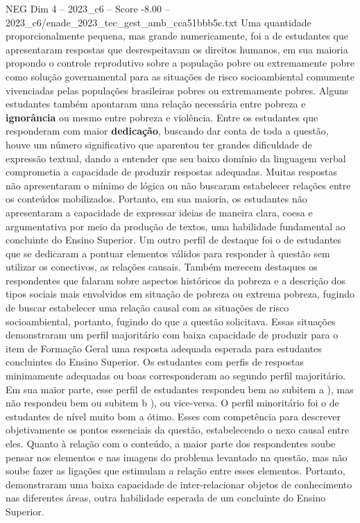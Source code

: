\begin{textsample}{NEG Dim 4 – 2023\_c6 – Score -8.00 – 2023\_c6/enade\_2023\_tec\_gest\_amb\_cca51bbb5c.txt}
Uma quantidade proporcionalmente pequena, mas grande numericamente, foi a de estudantes que apresentaram respostas que desrespeitavam os direitos humanos, em sua maioria propondo o controle reprodutivo sobre a população pobre ou extremamente pobre como solução governamental para as situações de risco socioambiental comumente vivenciadas pelas populações brasileiras pobres ou extremamente pobres.
Alguns estudantes também apontaram uma relação necessária entre pobreza e \textbf{ignorância} ou mesmo entre pobreza e violência.
Entre os estudantes que responderam com maior \textbf{dedicação}, buscando dar conta de toda a questão, houve um número significativo que aparentou ter grandes dificuldade de expressão textual, dando a entender que seu baixo domínio da linguagem verbal comprometia a capacidade de produzir respostas adequadas.
Muitas respostas não apresentaram o mínimo de lógica ou não buscaram estabelecer relações entre os conteúdos mobilizados.
Portanto, em sua maioria, os estudantes não apresentaram a capacidade de expressar ideias de maneira clara, coesa e argumentativa por meio da produção de textos, uma habilidade fundamental ao concluinte do Ensino Superior.
Um outro perfil de destaque foi o de estudantes que se dedicaram a pontuar elementos válidos para responder à questão sem utilizar os conectivos, as relações causais.
Também merecem destaques os respondentes que falaram sobre aspectos históricos da pobreza e a descrição dos tipos sociais mais envolvidos em situação de pobreza ou extrema pobreza, fugindo de buscar estabelecer uma relação causal com as situações de risco socioambiental, portanto, fugindo do que a questão solicitava.
Essas situações demonstraram um perfil majoritário com baixa capacidade de produzir para o item de Formação Geral uma resposta adequada esperada para estudantes concluintes do Ensino Superior.
Os estudantes com perfis de respostas minimamente adequadas ou boas corresponderam ao segundo perfil majoritário.
Em sua maior parte, esse perfil de estudantes respondeu bem ao subitem a ), mas não respondeu bem ou subitem b ), ou vice-versa.
O perfil minoritário foi o de estudantes de nível muito bom a ótimo.
Esses com competência para descrever objetivamente os pontos essenciais da questão, estabelecendo o nexo causal entre eles.
Quanto à relação com o conteúdo, a maior parte dos respondentes soube pensar nos elementos e nas imagens do problema levantado na questão, mas não soube fazer as ligações que estimulam a relação entre esses elementos.
Portanto, demonstraram uma baixa capacidade de inter-relacionar objetos de conhecimento nas diferentes áreas, outra habilidade esperada de um concluinte do Ensino Superior.

\end{textsample}
